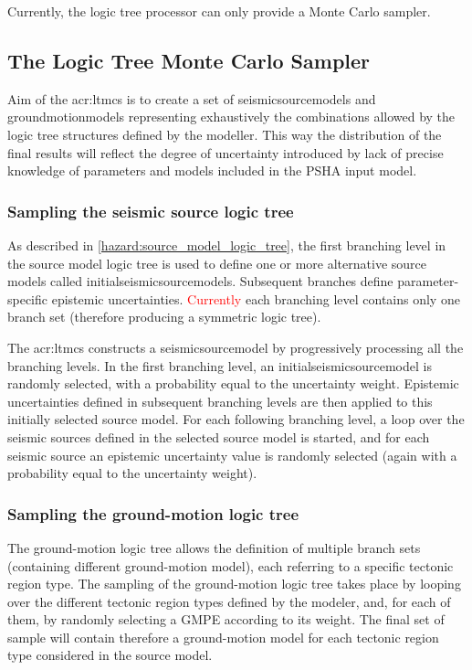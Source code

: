 Currently, the logic tree processor can only provide a Monte 
Carlo sampler.
%
\subsection{The Logic Tree Monte Carlo Sampler}
Aim of the \gls{acr:ltmcs} is to create a set of \glspl{seismicsourcemodel} 
and \glspl{groundmotionmodel} representing exhaustively the combinations 
allowed by the logic tree structures defined by the modeller.
% 
This way the distribution of the final results will reflect 
the degree of uncertainty introduced by lack of precise knowledge 
of parameters and models included in the PSHA input model.
%
\subsubsection{Sampling the seismic source logic tree}
As described in \ref{hazard:source_model_logic_tree}, the first branching 
level in the source model logic tree is used to define one or more 
alternative source models called \glspl{initialseismicsourcemodel}. 
%
Subsequent branches define parameter-specific epistemic uncertainties. 
\textcolor{red}{Currently} each branching level contains only one 
branch set (therefore producing a symmetric logic tree). 

The \gls{acr:ltmcs} constructs a \gls{seismicsourcemodel} by progressively
processing all the branching levels. In the first branching level, an 
\gls{initialseismicsourcemodel} is randomly selected, with a probability 
equal to the uncertainty 
weight. 
%
Epistemic uncertainties defined in subsequent branching levels are then 
applied to this initially selected source model. For each following 
branching level, a loop over the seismic sources defined in the selected
source model is started, and for each seismic source an epistemic 
uncertainty value is randomly selected (again with a probability equal to 
the uncertainty weight).
%
\subsubsection{Sampling the ground-motion logic tree}
The ground-motion logic tree allows the definition of multiple branch sets 
(containing different ground-motion model), each referring to a specific 
tectonic region type. 
%
The sampling of the ground-motion logic tree takes place by looping 
over the different tectonic region types defined by the modeler, and, for 
each of them, by randomly selecting a GMPE according to its weight. 
%
The final set of sample will contain therefore a ground-motion model for
each tectonic region type considered in the source model.


